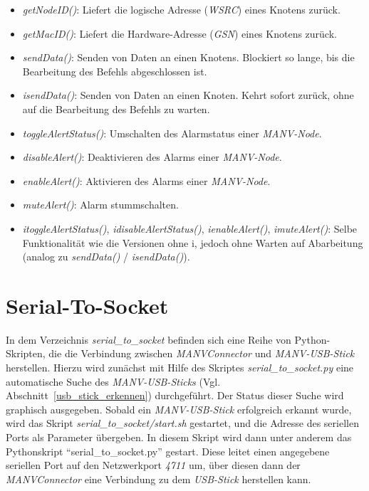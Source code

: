     \begin{itemize}
        \item{\emph{getNodeID()}:} Liefert die logische Adresse (\emph{WSRC}) eines Knotens zurück.
        \item{\emph{getMacID()}:} Liefert die Hardware-Adresse (\emph{GSN}) eines Knotens zurück.
        \item{\emph{sendData()}:} Senden von Daten an einen Knotens. Blockiert so lange, bis die Bearbeitung des
                           Befehls abgeschlossen ist.
        \item{\emph{isendData()}:} Senden von Daten an einen Knoten. Kehrt sofort zurück, ohne auf die Bearbeitung
                            des Befehls zu warten.
        \item{\emph{toggleAlertStatus()}:} Umschalten des Alarmstatus einer \emph{MANV-Node}.
        \item{\emph{disableAlert()}:} Deaktivieren des Alarms einer \emph{MANV-Node}.
        \item{\emph{enableAlert()}:} Aktivieren des Alarms einer \emph{MANV-Node}.
        \item{\emph{muteAlert()}:} Alarm stummschalten.
        \item{\emph{itoggleAlertStatus()}, \emph{idisableAlertStatus()}, \emph{ienableAlert()}, \emph{imuteAlert()}}: Selbe Funktionalität
            wie die Versionen ohne i, jedoch ohne Warten auf Abarbeitung (analog zu \emph{sendData()} / \emph{isendData()}).
    \end{itemize}

    \section{Serial-To-Socket}

    In dem Verzeichnis \emph{serial\_to\_socket} befinden sich eine Reihe von Python-Skripten, die die
    Verbindung zwischen \emph{MANVConnector} und \emph{MANV-USB-Stick} herstellen. Hierzu 
    wird zunächst mit Hilfe des Skriptes \emph{serial\_to\_socket.py} eine automatische Suche des
    \emph{MANV-USB-Sticks} (Vgl. Abschnitt~\ref{usb_stick_erkennen}) durchgeführt. Der Status
    dieser Suche wird graphisch ausgegeben. Sobald ein \emph{MANV-USB-Stick} erfolgreich
    erkannt wurde, wird das Skript \emph{serial\_to\_socket/start.sh} gestartet, und die
    Adresse des seriellen Ports als Parameter übergeben. In diesem Skript wird
    dann unter anderem das Pythonskript "`serial\_to\_socket.py"' gestart. Diese leitet einen
    angegebene seriellen Port auf den Netzwerkport \emph{4711} um, über diesen dann der
    \emph{MANVConnector} eine Verbindung zu dem \emph{USB-Stick} herstellen kann.
    
